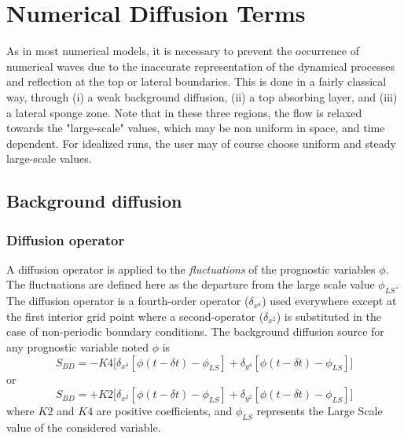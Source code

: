 
\chapter{Numerical Diffusion Terms}
\label{NumericalDiffusion}
\minitoc


As in most numerical models, it is necessary to prevent the occurrence of
numerical waves due to the inaccurate representation of the dynamical
processes and reflection at the top or lateral boundaries. This is done
in a fairly classical way, through (i) a weak background diffusion, (ii) a
top absorbing layer, and (iii) a lateral sponge zone. Note that in these
three regions, the flow is relaxed towards the "large-scale" values, which
may be non uniform in space, and time dependent. For idealized runs, the
user may of course choose uniform and steady large-scale values.

\section{Background diffusion}
\subsection{Diffusion operator}
A diffusion operator is applied to the {\em fluctuations} of the prognostic
variables $\phi$. The fluctuations are defined here as the departure
from the large scale value $\phi_{LS}$.
The diffusion operator is a fourth-order operator
($\delta_{x^4}$) used everywhere except at the first interior grid point where
a second-operator ($\delta_{x^2}$) is substituted in the case of non-periodic
boundary conditions.
The background diffusion source for any prognostic variable noted $\phi$
is
$$
S_{BD}=-K4 \big[ \delta_{x^4}[\phi(t-\delta t)- \phi_{LS}]+
\delta_{y^4}[\phi(t-\delta t)- \phi_{LS}]\big]
$$
or
$$
S_{BD}=+K2 \big[ \delta_{x^2}[\phi(t-\delta t)- \phi_{LS}]+
\delta_{y^2}[\phi(t-\delta t)- \phi_{LS}]\big]
$$
where $K2$ and $K4$ are positive coefficients, and $\phi_{LS}$ represents the
Large Scale value of the considered variable.


